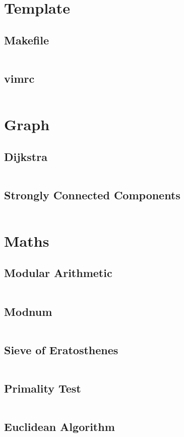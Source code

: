 \section{Template}
  \subsection{Makefile}
    \inputminted{basemake}{library/template/Makefile}
  \subsection{vimrc}
    \inputminted{vim}{library/template/.vimrc}

\section{Graph}
  \subsection{Dijkstra}
    \inputminted{cpp}{library/graphs/dijkstra.cpp}
  \subsection{Strongly Connected Components}
    \inputminted{cpp}{library/graphs/scc.cpp}

\section{Maths}
  \subsection{Modular Arithmetic}
    \inputminted{cpp}{library/maths/mod.hpp}
  \subsection{Modnum}
    \inputminted{cpp}{library/maths/modnum.hpp}
    \subsection{Sieve of Eratosthenes}
    \inputminted{cpp}{library/maths/sieve.cpp}
    \subsection{Primality Test}
      \inputminted{cpp}{library/maths/primality.hpp}
  \subsection{Euclidean Algorithm}
    \inputminted{cpp}{library/maths/euclidean.hpp}
